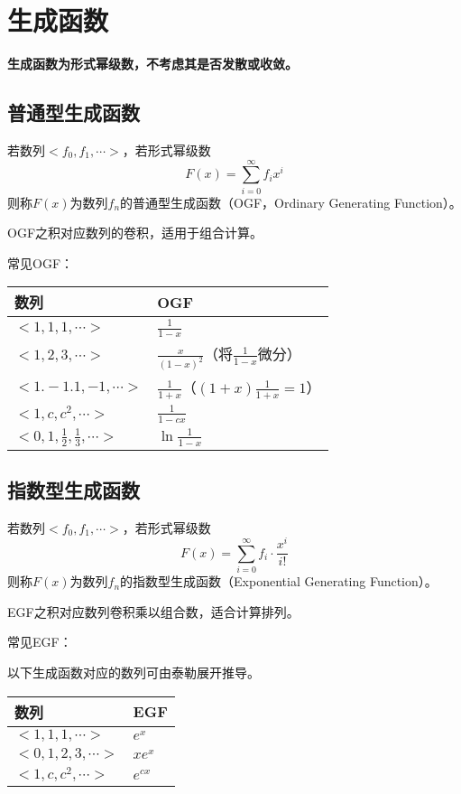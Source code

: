 \section{生成函数}
{\bfseries 生成函数为形式幂级数，不考虑其是否发散或收敛。}
\subsection{普通型生成函数}
若数列$<f_0,f_1,\cdots>$，若形式幂级数
\begin{displaymath}
	F(x)=\sum_{i=0}^\infty{f_ix^i}
\end{displaymath}
则称$F(x)$为数列${f_n}$的普通型生成函数（OGF，Ordinary Generating Function）。

OGF之积对应数列的卷积，适用于组合计算。

常见OGF：

\begin{tabular}{|l|l|}
	\hline
	数列                                   & OGF                                          \\
	\hline
	$<1,1,1,\cdots>$                       & $\frac{1}{1-x}$                              \\
	\hline
	$<1,2,3,\cdots>$                       & $\frac{x}{(1-x)^2}$（将$\frac{1}{1-x}$微分） \\
	\hline
	$<1.-1.1,-1,\cdots>$                   & $\frac{1}{1+x}$（$(1+x)\frac{1}{1+x}=1$）    \\
	\hline
	$<1,c,c^2,\cdots>$                     & $\frac{1}{1-cx}$                             \\
	\hline
	$<0,1,\frac{1}{2},\frac{1}{3},\cdots>$ & $\ln\frac{1}{1-x}$                           \\
	\hline
\end{tabular}
\subsection{指数型生成函数}
若数列$<f_0,f_1,\cdots>$，若形式幂级数
\begin{displaymath}
	F(x)=\sum_{i=0}^\infty{f_i\cdot\frac{x^i}{i!}}
\end{displaymath}
则称$F(x)$为数列${f_n}$的指数型生成函数（Exponential Generating Function）。

EGF之积对应数列卷积乘以组合数，适合计算排列。

常见EGF：

以下生成函数对应的数列可由泰勒展开推导。

\begin{tabular}{|l|l|}
	\hline
	数列               & EGF      \\
	\hline
	$<1,1,1,\cdots>$   & $e^x$    \\
	\hline
	$<0,1,2,3,\cdots>$ & $xe^x$   \\
	\hline
	$<1,c,c^2,\cdots>$ & $e^{cx}$ \\
	\hline
\end{tabular}

